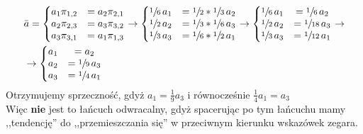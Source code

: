\documentclass[a4paper,12pt]{article}
\theoremstyle{definition}%
\theoremstyle{definition}
\theoremstyle{problem}
\begin{document}
\begin{align*}
&\bar{a}=\left\{\begin{matrix}
a_1\pi _{1,2} &= a_2\pi _{2,1}\\
a_2\pi _{2,3} &= a_3\pi _{3,2}\\
a_3\pi _{3,1} &= a_1\pi _{1,3}
\end{matrix}\right. \rightarrow \left\{\begin{matrix}
\sfrac{1}{6}\,a_1 &= \sfrac{1}{2}*\sfrac{1}{3}\,a_2\\
\sfrac{1}{2}\,a_2 &= \sfrac{1}{3}*\sfrac{1}{6}\,a_3\\
\sfrac{1}{3}\,a_3 &= \sfrac{1}{6}*\sfrac{1}{2}\,a_1
\end{matrix}\right. \rightarrow \left\{\begin{matrix}
\sfrac{1}{6}\,a_1 &= \sfrac{1}{6}\,a_2\\
\sfrac{1}{2}\,a_2 &= \sfrac{1}{18}\,a_3\\
\sfrac{1}{3}\,a_3 &= \sfrac{1}{12}\,a_1
\end{matrix}\right.\rightarrow \\
&\rightarrow \left\{\begin{matrix}
a_1 &= a_2\\
a_2 &= \sfrac{1}{9}\,a_3\\
a_3 &= \sfrac{1}{4}\,a_1
\end{matrix}\right.
\end{align*}
Otrzymujemy sprzeczność, gdyż  $a_1 = \frac{1}{9}a_3$ i równocześnie $\frac{1}{4}a_1 = a_3$\\
Więc \textbf{nie} jest to łańcuch odwracalny, gdyż spacerując po tym łańcuchu mamy ,,tendencję'' do ,,przemieszczania się'' w przeciwnym kierunku wskazówek zegara.
\end{document}
